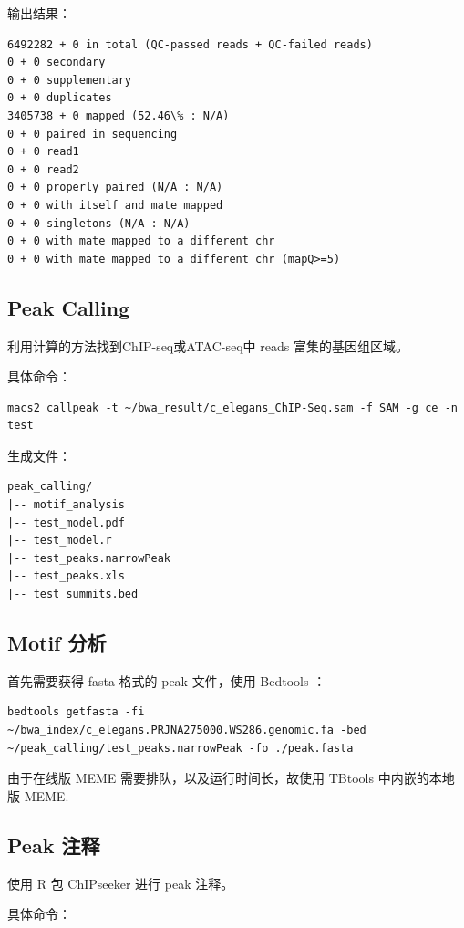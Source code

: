 \documentclass[UTF8]{ctexart}
\begin{document}
输出结果：

\begin{lstlisting}
6492282 + 0 in total (QC-passed reads + QC-failed reads)
0 + 0 secondary
0 + 0 supplementary
0 + 0 duplicates
3405738 + 0 mapped (52.46\% : N/A)
0 + 0 paired in sequencing
0 + 0 read1
0 + 0 read2
0 + 0 properly paired (N/A : N/A)
0 + 0 with itself and mate mapped
0 + 0 singletons (N/A : N/A)
0 + 0 with mate mapped to a different chr
0 + 0 with mate mapped to a different chr (mapQ>=5)
\end{lstlisting}

\subsection{Peak Calling}

利用计算的方法找到ChIP-seq或ATAC-seq中 reads 富集的基因组区域。

具体命令：

\begin{lstlisting}
macs2 callpeak -t ~/bwa_result/c_elegans_ChIP-Seq.sam -f SAM -g ce -n test
\end{lstlisting}

生成文件：

\begin{lstlisting}
peak_calling/
|-- motif_analysis
|-- test_model.pdf
|-- test_model.r
|-- test_peaks.narrowPeak
|-- test_peaks.xls
|-- test_summits.bed
\end{lstlisting}


\subsection{Motif 分析}

首先需要获得 fasta 格式的 peak 文件，使用 Bedtools ：

\begin{lstlisting}
bedtools getfasta -fi ~/bwa_index/c_elegans.PRJNA275000.WS286.genomic.fa -bed ~/peak_calling/test_peaks.narrowPeak -fo ./peak.fasta
\end{lstlisting}

由于在线版 MEME 需要排队，以及运行时间长，故使用 TBtools 中内嵌的本地版 MEME.

\subsection{Peak 注释}

使用 R 包 ChIPseeker 进行 peak 注释。

具体命令：
\end{document}
